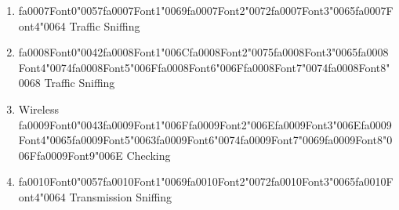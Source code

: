 \documentclass[12pt]{article}
\begin{document}
\begin{enumerate}[label=\arabic*.]
\begin{enumerate}[label=(\alph*)]
    \item {\csname fa0007Font0\endcsname\char"0057}{\csname fa0007Font1\endcsname\char"0069}{\csname fa0007Font2\endcsname\char"0072}{\csname fa0007Font3\endcsname\char"0065}{\csname fa0007Font4\endcsname\char"0064} Traffic Sniffing
    \item {\csname fa0008Font0\endcsname\char"0042}{\csname fa0008Font1\endcsname\char"006C}{\csname fa0008Font2\endcsname\char"0075}{\csname fa0008Font3\endcsname\char"0065}{\csname fa0008Font4\endcsname\char"0074}{\csname fa0008Font5\endcsname\char"006F}{\csname fa0008Font6\endcsname\char"006F}{\csname fa0008Font7\endcsname\char"0074}{\csname fa0008Font8\endcsname\char"0068} Traffic Sniffing
    \item Wireless {\csname fa0009Font0\endcsname\char"0043}{\csname fa0009Font1\endcsname\char"006F}{\csname fa0009Font2\endcsname\char"006E}{\csname fa0009Font3\endcsname\char"006E}{\csname fa0009Font4\endcsname\char"0065}{\csname fa0009Font5\endcsname\char"0063}{\csname fa0009Font6\endcsname\char"0074}{\csname fa0009Font7\endcsname\char"0069}{\csname fa0009Font8\endcsname\char"006F}{\csname fa0009Font9\endcsname\char"006E} Checking
    \item {\csname fa0010Font0\endcsname\char"0057}{\csname fa0010Font1\endcsname\char"0069}{\csname fa0010Font2\endcsname\char"0072}{\csname fa0010Font3\endcsname\char"0065}{\csname fa0010Font4\endcsname\char"0064} Transmission Sniffing
\end{enumerate}
\end{enumerate}
\end{document}
